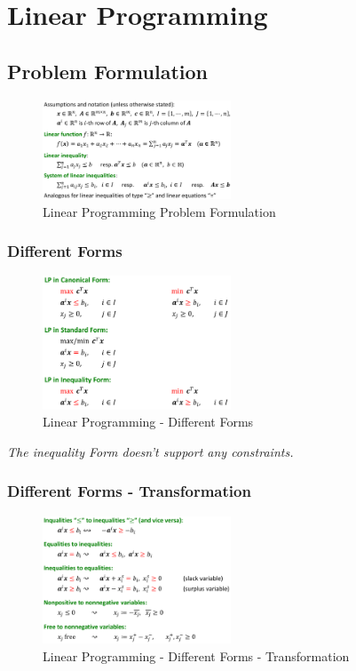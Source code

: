 \section{Linear Programming}

\subsection{Problem Formulation}

\begin{figure}[H]
\centering
\includegraphics[width=0.5\textwidth]{figures/linearProgrammingProblemFormulation.png}
\caption{Linear Programming Problem Formulation}
\end{figure}

\subsubsection{Different Forms}
\begin{figure}[H]
\centering
\includegraphics[width=0.5\textwidth]{figures/differentFormsLP.png}
\caption{Linear Programming - Different Forms}
\end{figure}

\textit{The inequality Form doesn't support any constraints.}

\subsubsection{Different Forms - Transformation}
\begin{figure}[H]
\centering
\includegraphics[width=0.5\textwidth]{figures/differentFormsTransformation.png}
\caption{Linear Programming - Different Forms - Transformation}
\end{figure}

